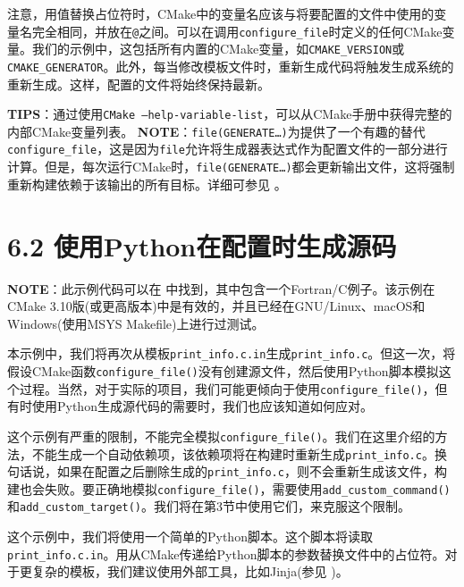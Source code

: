 注意，用值替换占位符时，CMake中的变量名应该与将要配置的文件中使用的变量名完全相同，并放在\texttt{@}之间。可以在调用\texttt{configure\_file}时定义的任何CMake变量。我们的示例中，这包括所有内置的CMake变量，如\texttt{CMAKE\_VERSION}或\texttt{CMAKE\_GENERATOR}。此外，每当修改模板文件时，重新生成代码将触发生成系统的重新生成。这样，配置的文件将始终保持最新。

\begin{myInfoBox}
\textbf{TIPS}：通过使用\texttt{CMake --help-variable-list}，可以从CMake手册中获得完整的内部CMake变量列表。 \textbf{NOTE}：\texttt{file(GENERATE…)}为提供了一个有趣的替代\texttt{configure\_file}，这是因为\texttt{file}允许将生成器表达式作为配置文件的一部分进行计算。但是，每次运行CMake时，\texttt{file(GENERATE…)}都会更新输出文件，这将强制重新构建依赖于该输出的所有目标。详细可参见 。
\end{myInfoBox}


\section{6.2 使用Python在配置时生成源码}

\begin{myInfoBox}
\textbf{NOTE}：此示例代码可以在  中找到，其中包含一个Fortran/C例子。该示例在CMake 3.10版(或更高版本)中是有效的，并且已经在GNU/Linux、macOS和Windows(使用MSYS Makefile)上进行过测试。
\end{myInfoBox}

本示例中，我们将再次从模板\texttt{print\_info.c.in}生成\texttt{print\_info.c}。但这一次，将假设CMake函数\texttt{configure\_file()}没有创建源文件，然后使用Python脚本模拟这个过程。当然，对于实际的项目，我们可能更倾向于使用\texttt{configure\_file()}，但有时使用Python生成源代码的需要时，我们也应该知道如何应对。

这个示例有严重的限制，不能完全模拟\texttt{configure\_file()}。我们在这里介绍的方法，不能生成一个自动依赖项，该依赖项将在构建时重新生成\texttt{print\_info.c}。换句话说，如果在配置之后删除生成的\texttt{print\_info.c}，则不会重新生成该文件，构建也会失败。要正确地模拟\texttt{configure\_file()}，需要使用\texttt{add\_custom\_command()}和\texttt{add\_custom\_target()}。我们将在第3节中使用它们，来克服这个限制。

这个示例中，我们将使用一个简单的Python脚本。这个脚本将读取\texttt{print\_info.c.in}。用从CMake传递给Python脚本的参数替换文件中的占位符。对于更复杂的模板，我们建议使用外部工具，比如Jinja(参见 )。

